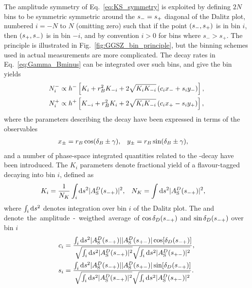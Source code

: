 The amplitude symmetry of Eq.~\eqref{eq:KS_symmetry} is exploited by defining $2N$ bins to be symmetric symmetric around the $s_-=s_+$ diagonal of the Dalitz plot, numbered $i=-N$ to $N$ (omitting zero) such that if the point $(s_-, s_+)$ is in bin $i$, then $(s_+, s_-)$ is in bin $-i$, and by convention $i>0$ for bins where $s_- >s_+$. The principle is illustrated in Fig.~\ref{fig:GGSZ_bin_principle}, but the binning schemes used in actual measurements are more complicated. The decay rates in Eq.~\eqref{eq:Gamma_Bminus} can be integrated over such bins, and give the bin yields
\begin{align}
\begin{split}    \label{eq:base_GGSZ_yields}
    N^-_i &\propto h^- \left[K_i + r_{B}^2K_{-i} + 2\sqrt{K_iK_{-i}}\left(c_ix_-+s_iy_-\right)\right], \\
    N^+_i &\propto h^+ \left[K_{-i} + r_{B}^2K_i + 2\sqrt{K_iK_{-i}}\left(c_ix_+-s_iy_+\right)\right],
\end{split}
\end{align}
where the parameters describing the \B decay have been expressed in terms of the observables
\begin{align}
    x_\pm &= r_{B} \cos (\delta_{B} \pm \gamma), & y_\pm &= r_{B} \sin (\delta_{B} \pm \gamma),
\end{align}
 and a number of phase-space integrated quantities related to the \D-decay have been introduced. The $K_i$ parameters denote fractional yield of a flavour-tagged \Dz decaying into bin $i$, defined as
\begin{align}\label{eq:base_ki}
    K_i &= \frac{1}{N_K}\int_i\text{d}s^2 |A_{\rm S}^{D}(s_{-+})|^2, &
    N_K &=\int\text{d}s^2 |A_{\rm S}^{D}(s_{-+})|^2,
\end{align}
where $\int_i \text d s^2$ denotes integration over bin $i$ of the Dalitz plot. The \ci and \si denote the amplitude-weigthed average of $\cos \delta_D(s_{-+})$ and $\sin \delta_D(s_{-+})$ over bin $i$
\begin{align}\label{eq:ci_si}
\begin{split}
    c_i &= \frac
    {\int_i \text{d}s^2 |A_{\rm S}^{D}(s_{-+})||A_{\rm S}^{D}(s_{+-})|\cos[\delta_D(s_{-+})]}
    {\sqrt{\int_i \text{d}s^2 |A_{\rm S}^{D}(s_{-+})|^2}\sqrt{\int_i \text{d}s^2 |A_{\rm S}^{D}(s_{+-})|^2}}, \\
    s_i &= \frac
    {\int_i \text{d}s^2 |A_{\rm S}^{D}(s_{-+})||A_{\rm S}^{D}(s_{+-})|\sin[\delta_D(s_{-+})]}
    {\sqrt{\int_i \text{d}s^2 |A_{\rm S}^{D}(s_{-+})|^2}\sqrt{\int_i \text{d}s^2 |A_{\rm S}^{D}(s_{+-})|^2}}.
\end{split}
\end{align}
